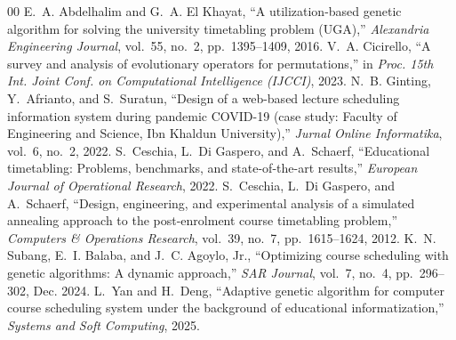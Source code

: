 \documentclass[conference]{IEEEtran}
\begin{document}
\begin{thebibliography}{00}
 E.~A. Abdelhalim and G.~A. El Khayat, ``A utilization-based genetic algorithm for solving the university timetabling problem (UGA),'' \emph{Alexandria Engineering Journal}, vol.~55, no.~2, pp.~1395--1409, 2016.
 V.~A. Cicirello, ``A survey and analysis of evolutionary operators for permutations,'' in \emph{Proc. 15th Int. Joint Conf. on Computational Intelligence (IJCCI)}, 2023.
 N.~B. Ginting, Y.~Afrianto, and S.~Suratun, ``Design of a web-based lecture scheduling information system during pandemic COVID-19 (case study: Faculty of Engineering and Science, Ibn Khaldun University),'' \emph{Jurnal Online Informatika}, vol.~6, no.~2, 2022.
 S.~Ceschia, L.~Di Gaspero, and A.~Schaerf, ``Educational timetabling: Problems, benchmarks, and state-of-the-art results,'' \emph{European Journal of Operational Research}, 2022.
 S.~Ceschia, L.~Di Gaspero, and A.~Schaerf, ``Design, engineering, and experimental analysis of a simulated annealing approach to the post-enrolment course timetabling problem,'' \emph{Computers \& Operations Research}, vol.~39, no.~7, pp.~1615--1624, 2012.
 K.~N. Subang, E.~I. Balaba, and J.~C. Agoylo, Jr., ``Optimizing course scheduling with genetic algorithms: A dynamic approach,'' \emph{SAR Journal}, vol.~7, no.~4, pp.~296--302, Dec. 2024.
 L.~Yan and H.~Deng, ``Adaptive genetic algorithm for computer course scheduling system under the background of educational informatization,'' \emph{Systems and Soft Computing}, 2025.
\end{thebibliography}
\end{document}
